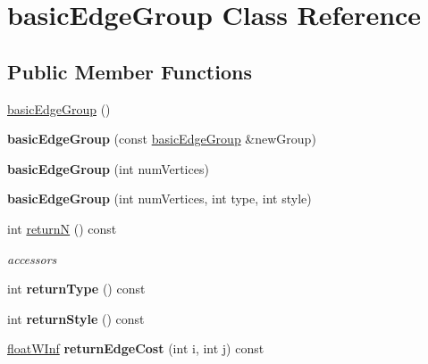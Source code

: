\hypertarget{classbasicEdgeGroup}{
\section{basicEdgeGroup Class Reference}
\label{classbasicEdgeGroup}
}
\subsection*{Public Member Functions}
\begin{DoxyCompactItemize}
\item 
\hyperlink{classbasicEdgeGroup_a79511641ab850769fc8da34e12b42dad}{basicEdgeGroup} ()
\item 
\hypertarget{classbasicEdgeGroup_af72a8735d7fdb5316dec8d6b96f28437}{
{\bfseries basicEdgeGroup} (const \hyperlink{classbasicEdgeGroup}{basicEdgeGroup} \&newGroup)}
\label{classbasicEdgeGroup_af72a8735d7fdb5316dec8d6b96f28437}

\item 
\hypertarget{classbasicEdgeGroup_ab725ac58a9ad15ee7301b610276241ce}{
{\bfseries basicEdgeGroup} (int numVertices)}
\label{classbasicEdgeGroup_ab725ac58a9ad15ee7301b610276241ce}

\item 
\hypertarget{classbasicEdgeGroup_a5db21c9483844f7e2d4b5e7861c9bd87}{
{\bfseries basicEdgeGroup} (int numVertices, int type, int style)}
\label{classbasicEdgeGroup_a5db21c9483844f7e2d4b5e7861c9bd87}

\item 
\hypertarget{classbasicEdgeGroup_a2cdd72fdc2b899bf9ad67194521d98bd}{
int \hyperlink{classbasicEdgeGroup_a2cdd72fdc2b899bf9ad67194521d98bd}{returnN} () const }
\label{classbasicEdgeGroup_a2cdd72fdc2b899bf9ad67194521d98bd}

\begin{DoxyCompactList}\small\item\em accessors \end{DoxyCompactList}\item 
\hypertarget{classbasicEdgeGroup_aea79756fb097b3ea6a27e33eed736cb5}{
int {\bfseries returnType} () const }
\label{classbasicEdgeGroup_aea79756fb097b3ea6a27e33eed736cb5}

\item 
\hypertarget{classbasicEdgeGroup_ac0f031a061ad9fd00e8d5666733b3480}{
int {\bfseries returnStyle} () const }
\label{classbasicEdgeGroup_ac0f031a061ad9fd00e8d5666733b3480}

\item 
\hypertarget{classbasicEdgeGroup_abbd9e48acb19e9cad45319f0cb3ca3b7}{
\hyperlink{classfloatWInf}{floatWInf} {\bfseries returnEdgeCost} (int i, int j) const }
\label{classbasicEdgeGroup_abbd9e48acb19e9cad45319f0cb3ca3b7}


\end{DoxyCompactItemize}
